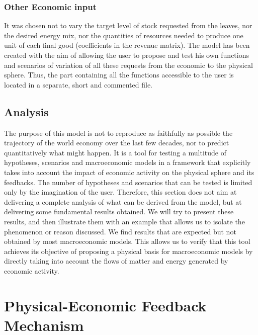 \documentclass[12pt,a4paper]{article}%
\begin{document}
\begin{appendix}
\subsubsection{Other Economic input}
It was chosen not to vary the target level of stock requested from the leaves, nor the desired energy mix, nor the quantities of resources needed to produce one unit of each final good (coefficients in the revenue matrix). The model has been created with the aim of allowing the user to propose and test his own functions and scenarios of variation of all these requests from the economic to the physical sphere. Thus, the part containing all the functions accessible to the user is located in a separate, short and commented file.  	

\subsection{Analysis} 
The purpose of this model is not to reproduce as faithfully as possible the trajectory of the world economy over the last few decades, nor to predict quantitatively what might happen. It is a tool for testing a multitude of hypotheses, scenarios and macroeconomic models in a framework that explicitly takes into account the impact of economic activity on the physical sphere and its feedbacks.  The number of hypotheses and scenarios that can be tested is limited only by the imagination of the user. Therefore, this section does not aim at delivering a complete analysis of what can be derived from the model, but at delivering some fundamental results obtained. We will try to present these results, and then illustrate them with an example that allows us to isolate the phenomenon or reason discussed.  We find results that are expected but not obtained by most macroeconomic models. This allows us to verify that this tool achieves its objective of proposing a physical basis for macroeconomic models by directly taking into account the flows of matter and energy generated by economic activity. 

\section{Physical-Economic Feedback Mechanism}

\end{appendix}
\end{document}
